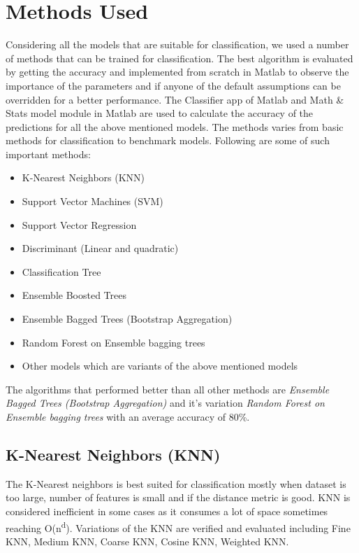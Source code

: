 \documentclass[journal, a4paper]{IEEEtran}
\begin{document}
\section{Methods Used}
Considering all the models that are suitable for classification, we used a number of methods that can be trained for classification. The best algorithm is evaluated by getting the accuracy and implemented from scratch in Matlab to observe the importance of the parameters and if anyone of the default assumptions can be overridden for a better performance. The Classifier app of Matlab and Math \& Stats model module in Matlab are used to calculate the accuracy of the predictions for all the above mentioned models. The methods varies from basic methods for classification to benchmark models. Following are some of such important methods:
\begin{itemize}
\item K-Nearest Neighbors (KNN)
\item Support Vector Machines (SVM)
\item Support Vector Regression
\item Discriminant (Linear and quadratic)
\item Classification Tree
\item Ensemble Boosted Trees
\item Ensemble Bagged Trees (Bootstrap Aggregation)
\item Random Forest on Ensemble bagging trees
\item Other models which are variants of the above mentioned models
\end{itemize}

\indent The algorithms that performed better than all other methods are \textit{Ensemble Bagged Trees (Bootstrap Aggregation)} and it's variation \textit{Random Forest on Ensemble bagging trees} with an average accuracy of 80\%.
\subsection{K-Nearest Neighbors (KNN)}
The K-Nearest neighbors is best suited for classification mostly when dataset is too large, number of features is small and if the distance metric is good. KNN is considered inefficient in some cases as it consumes a lot of space sometimes reaching O(n\textsuperscript{d}). Variations of the KNN are verified and evaluated including Fine KNN, Medium KNN, Coarse KNN, Cosine KNN, Weighted KNN. 
\end{document}
